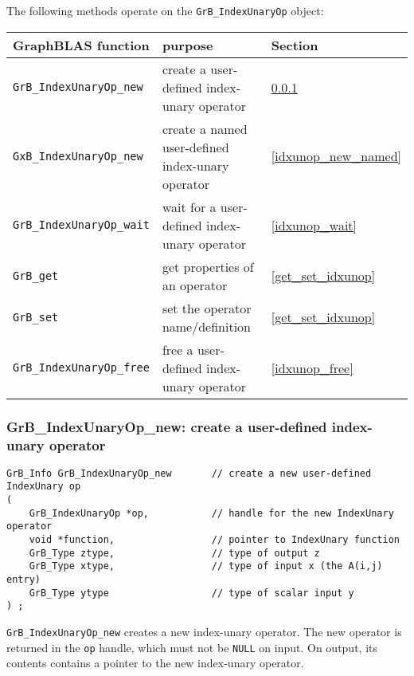 \documentclass[12pt]{article}
\begin{document}
The following methods operate on the \verb'GrB_IndexUnaryOp' object:

\vspace{0.1in}
\noindent
{\footnotesize
\begin{tabular}{lll}
\hline
GraphBLAS function   & purpose                                      & Section \\
\hline
\verb'GrB_IndexUnaryOp_new'   & create a user-defined index-unary operator   & \ref{idxunop_new} \\
\verb'GxB_IndexUnaryOp_new'   & create a named user-defined index-unary operator   & \ref{idxunop_new_named} \\
\verb'GrB_IndexUnaryOp_wait'  & wait for a user-defined index-unary operator  & \ref{idxunop_wait} \\
\verb'GrB_get'           & get properties of an operator    & \ref{get_set_idxunop} \\
\verb'GrB_set'           & set the operator name/definition & \ref{get_set_idxunop} \\
\verb'GrB_IndexUnaryOp_free'  & free a user-defined index-unary operator      & \ref{idxunop_free} \\
\hline
\end{tabular}
}
\vspace{0.1in}

\newpage
\subsubsection{{\sf GrB\_IndexUnaryOp\_new:} create a user-defined index-unary operator}
\label{idxunop_new}

\begin{mdframed}[userdefinedwidth=6in]
{\footnotesize
\begin{verbatim}
GrB_Info GrB_IndexUnaryOp_new       // create a new user-defined IndexUnary op
(
    GrB_IndexUnaryOp *op,           // handle for the new IndexUnary operator
    void *function,                 // pointer to IndexUnary function
    GrB_Type ztype,                 // type of output z
    GrB_Type xtype,                 // type of input x (the A(i,j) entry)
    GrB_Type ytype                  // type of scalar input y
) ;
\end{verbatim} }\end{mdframed}


\verb'GrB_IndexUnaryOp_new' creates a new index-unary operator.  The new operator is
returned in the \verb'op' handle, which must not be \verb'NULL' on input.
On output, its contents contains a pointer to the new index-unary operator.
\end{document}
